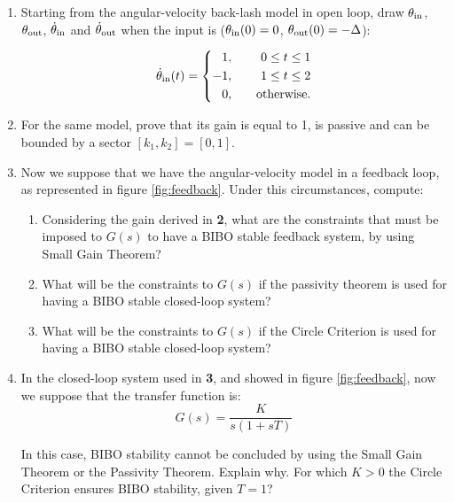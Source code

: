 \begin{enumerate}
\item Starting from the angular-velocity back-lash model in open loop, draw $\operatorname{\theta_\textrm{in}}$, $\operatorname{\theta_\textrm{out}}$, $\operatorname{\dot{\theta}_\textrm{in}}$ and $\operatorname{\dot{\theta}_\textrm{out}}$ when the input is ($\operatorname{\theta_\textrm{in}}(0) = 0$, $\operatorname{\theta_\textrm{out}}(0) = -\Delta$):

\begin{equation}
 \operatorname{\dot{\theta}_\textrm{in}} (t) = 
    \left\{\begin{aligned} 
      1 &,& \quad  0 \leq t \leq 1 \\
      -1 &,& \quad  1 \leq t \leq 2 \\
      0 &,& \quad \textrm{otherwise.}
    \end{aligned}\right.
    \label{eq:inputBL}
\end{equation}



\item For the same model, prove that its gain is equal to 1, is passive and can be bounded by a sector $[k_1, k_2] = [0,1]$.

\item Now we suppose that we have the angular-velocity model in a feedback loop, as represented in figure \ref{fig:feedback}. Under this circumstances, compute:

\begin{enumerate}
\item Considering the gain derived in \textbf{2}, what are the constraints that must be imposed to $G(s)$ to have a BIBO stable feedback system, by using Small Gain Theorem?
\item What will be the constraints to $G(s)$ if the passivity theorem is used for having a BIBO stable closed-loop system?
\item What will be the constraints to $G(s)$ if the Circle Criterion is used for having a BIBO stable closed-loop system?
\end{enumerate}

\item In the closed-loop system used in \textbf{3}, and showed in figure \ref{fig:feedback}, now we suppose that the transfer function is: 
\begin{equation}
G(s) = \frac{K}{s(1+sT)}
\label{eq:gs}
\end{equation}

In this case, BIBO stability cannot be concluded by using the Small Gain Theorem or the Passivity Theorem. Explain why. For which $K>0$ the Circle Criterion ensures BIBO stability, given $T=1$?


\end{enumerate}
